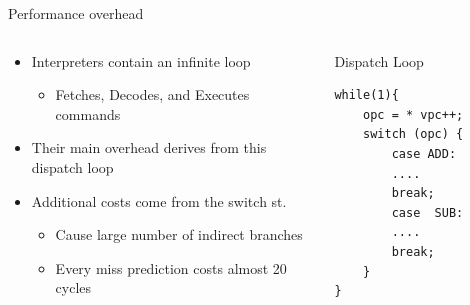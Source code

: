 \documentclass[10pt]{beamer}
\begin{document}
\begin{frame}[fragile]{Performance overhead}
    \begin{columns}[T] %
        \begin{column}{.65\textwidth}
            \begin{center}
                \begin{itemize}
                    \item {Interpreters contain an infinite loop}
                        \begin{itemize}
                            \item {Fetches, Decodes, and Executes commands}
                        \end{itemize}
                    \item {Their main overhead derives from this dispatch loop}
                    \item {Additional costs come from the switch st.}
                        \begin{itemize}
                            \item {Cause large number of indirect branches}
                            \item {Every miss prediction costs almost 20 cycles}
                        \end{itemize}
                \end{itemize}
            \end{center}
        \end{column}%
            \hfill%
            \begin{column}{.35\textwidth}
                \begin{alertblock}{Dispatch Loop}
                    \begin{center}
                        \begin{lstlisting}[basicstyle=\footnotesize , breaklines]
while(1){
    opc = * vpc++;
    switch (opc) {
        case ADD:
        ....
        break;
        case  SUB:
        ....				
        break;
    }	
}
                        \end{lstlisting}
                    \end{center}
                \end{alertblock}
            \end{column}%
    \end{columns}
\end{frame}
\end{document}
